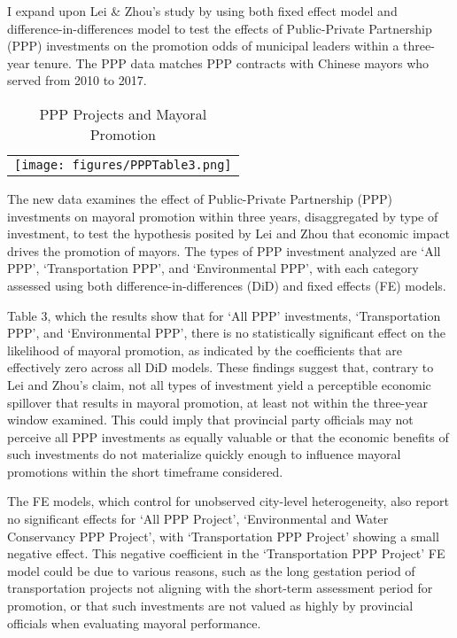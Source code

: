 \documentclass[12pt, ]{article}
\begin{document}
I expand upon Lei \& Zhou's study by using both fixed effect model and
difference-in-differences model to test the effects of Public-Private
Partnership (PPP) investments on the promotion odds of municipal leaders
within a three-year tenure. The PPP data matches PPP contracts with
Chinese mayors who served from 2010 to 2017.\citep{li2023public}

\hypertarget{tbl-main}{}
\begin{longtable}[]{@{}l@{}}
\caption{\label{tbl-main}PPP Projects and Mayoral
Promotion}\tabularnewline
\toprule\noalign{}
\endfirsthead
\endhead
\bottomrule\noalign{}
\endlastfoot
\texttt{[image: figures/PPPTable3.png]} \\
\end{longtable}

The new data examines the effect of Public-Private Partnership (PPP)
investments on mayoral promotion within three years, disaggregated by
type of investment, to test the hypothesis posited by Lei and Zhou that
economic impact drives the promotion of mayors. The types of PPP
investment analyzed are `All PPP', `Transportation PPP', and
`Environmental PPP', with each category assessed using both
difference-in-differences (DiD) and fixed effects (FE) models.

Table 3, which the results show that for `All PPP' investments,
`Transportation PPP', and `Environmental PPP', there is no statistically
significant effect on the likelihood of mayoral promotion, as indicated
by the coefficients that are effectively zero across all DiD models.
These findings suggest that, contrary to Lei and Zhou's claim, not all
types of investment yield a perceptible economic spillover that results
in mayoral promotion, at least not within the three-year window
examined. This could imply that provincial party officials may not
perceive all PPP investments as equally valuable or that the economic
benefits of such investments do not materialize quickly enough to
influence mayoral promotions within the short timeframe considered.

The FE models, which control for unobserved city-level heterogeneity,
also report no significant effects for `All PPP Project', `Environmental
and Water Conservancy PPP Project', with `Transportation PPP Project'
showing a small negative effect. This negative coefficient in the
`Transportation PPP Project' FE model could be due to various reasons,
such as the long gestation period of transportation projects not
aligning with the short-term assessment period for promotion, or that
such investments are not valued as highly by provincial officials when
evaluating mayoral performance.
\end{document}

